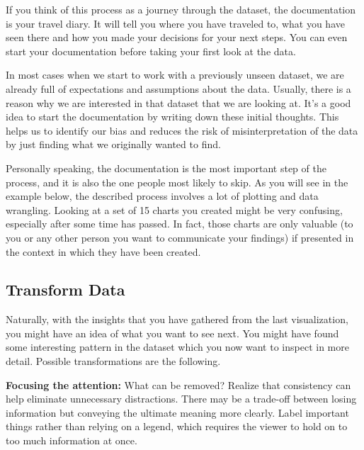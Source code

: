 \documentclass[]{book}
\begin{document}
If you think of this process as a journey through the dataset, the documentation is your travel diary. It will tell you where you have traveled to, what you have seen there and how you made your decisions for your next steps. You can even start your documentation before taking your first look at the data.

In most cases when we start to work with a previously unseen dataset, we are already full of expectations and assumptions about the data. Usually, there is a reason why we are interested in that dataset that we are looking at. It's a good idea to start the documentation by writing down these initial thoughts. This helps us to identify our bias and reduces the risk of misinterpretation of the data by just finding what we originally wanted to find.

Personally speaking, the documentation is the most important step of the process, and it is also the one people most likely to skip. As you will see in the example below, the described process involves a lot of plotting and data wrangling. Looking at a set of 15 charts you created might be very confusing, especially after some time has passed. In fact, those charts are only valuable (to you or any other person you want to communicate your findings) if presented in the context in which they have been created.

\hypertarget{transform-data}{%
\subsection{Transform Data}\label{transform-data}}

Naturally, with the insights that you have gathered from the last visualization, you might have an idea of what you want to see next. You might have found some interesting pattern in the dataset which you now want to inspect in more detail. Possible transformations are the following.

\textbf{Focusing the attention:}
What can be removed? Realize that consistency can help eliminate unnecessary distractions. There may be a trade-off between losing information but conveying the ultimate meaning more clearly. Label important things rather than relying on a legend, which requires the viewer to hold on to too much information at once.
\end{document}
